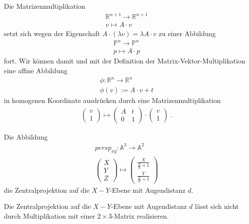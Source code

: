 Die Matrizenmultiplikation
\begin{align*}
\mathbb{R}^{n+1} \to \mathbb{R}^{n+1} \\
v \mapsto A \cdot v
\end{align*}
setzt sich wegen der Eigenschaft $A \cdot (\lambda v) = \lambda A \cdot v$ zu einer Abbildung
\begin{align*}
\mathbb{P}^{n} \to \mathbb{P}^{n} \\
p \mapsto A \cdot p
\end{align*}
fort. Wir können damit und mit der Definition der Matrix-Vektor-Multiplikation eine affine Abbildung 
\begin{align*}
\phi : \mathbb{R}^{n} \to \mathbb{R}^{n} \\
\phi(v):=  A \cdot v + t
\end{align*}
in homogenen Koordinate ausdrücken durch eine Matrizenmultiplikation
\begin{align*}
\begin{pmatrix} v \\ 1\end{pmatrix} \mapsto \begin{pmatrix}  A  & t  \\ 0 &1\end{pmatrix} \cdot  \begin{pmatrix} v \\ 1\end{pmatrix}   \; .
\end{align*}

\begin{Definition}
Die Abbildung 
\begin{align*}
persp_{xy} : \mathbb{A}^3 \to \mathbb{A}^2 \\
\begin{pmatrix}  X \\ Y \\ Z\end{pmatrix}  \mapsto \begin{pmatrix}  \frac{X}{\frac{Z}{d} +1 } \\   \frac{Y}{\frac{Z}{d} +1 } \end{pmatrix}
\end{align*}
die Zentralprojektion auf die $X-Y$-Ebene mit Augendistanz $d$.
\end{Definition} 

\begin{Bemerkung}
Die Zentralprojektion auf die $X-Y$-Ebene mit Augendistanz $d$ lässt sich nicht durch Multiplikation mit einer  $2 \times 3$-Matrix realisieren.
\end{Bemerkung}




